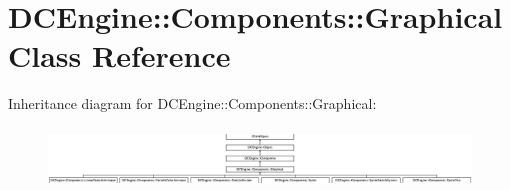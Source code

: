 \hypertarget{classDCEngine_1_1Components_1_1Graphical}{\section{D\-C\-Engine\-:\-:Components\-:\-:Graphical Class Reference}
\label{classDCEngine_1_1Components_1_1Graphical}
}
Inheritance diagram for D\-C\-Engine\-:\-:Components\-:\-:Graphical\-:\begin{figure}[H]
\begin{center}
\leavevmode
\includegraphics[height=1.626016cm]{classDCEngine_1_1Components_1_1Graphical}
\end{center}
\end{figure}
